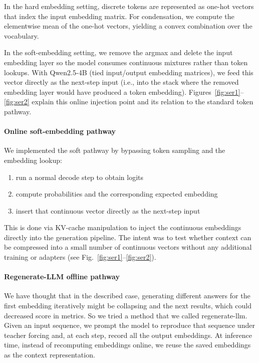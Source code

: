 In the hard embedding setting, discrete tokens are represented as one-hot vectors that index the input embedding matrix.
For condensation, we compute the elementwise mean of the one-hot vectors, yielding a convex combination over the vocabulary.

In the soft-embedding setting, we remove the argmax and delete the input embedding layer so the model consumes continuous mixtures rather than token lookups.
With Qwen2.5-4B (tied input/output embedding matrices), we feed this vector directly as the next-step input (i.e., into the stack where the removed embedding layer would have produced a token embedding).
Figures~\ref{fig:ser1}–\ref{fig:ser2} explain this online injection point and its relation to the standard token pathway.

\paragraph{Online soft-embedding pathway}
We implemented the soft pathway by bypassing token sampling and the embedding lookup:
\begin{enumerate}
    \item run a normal decode step to obtain logits
    \item compute probabilities and the corresponding expected embedding
    \item insert that continuous vector directly as the next-step input
\end{enumerate}
This is done via KV-cache manipulation to inject the continuous embeddings directly into the generation pipeline.
The intent was to test whether context can be compressed into a small number of continuous vectors without any additional training or adapters (see Fig.~\ref{fig:ser1}–\ref{fig:ser2}).

\paragraph{Regenerate-LLM offline pathway}
We have thought that in the described case, generating different answers for the first embedding iteratively might be collapsing and the next results, which could decreased score in metrics.
So we tried a method that we called regenerate-llm.
Given an input sequence, we prompt the model to reproduce that sequence under teacher forcing and, at each step, record all the output embeddings.
At inference time, instead of recomputing embeddings online, we reuse the saved embeddings as the context representation.

